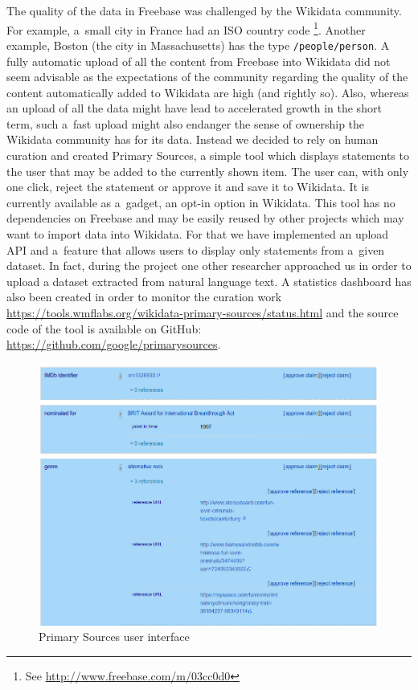 \documentclass{sig-alternate}
\begin{document}
The quality of the data in Freebase was challenged by the Wikidata community.
For example, a~small city in France had an ISO country code%
\footnote{See \url{http://www.freebase.com/m/03cc0d0}}.
Another example, Boston (the city in Massachusetts) has the type \texttt{/people/person}.
A fully automatic upload of all the content from Freebase into Wikidata
did not seem advisable as the expectations of the community regarding
the quality of the content automatically added to Wikidata are high (and rightly so).
Also, whereas an upload of all the data might have lead to accelerated growth
in the short term, such a~fast upload might also endanger the sense of ownership
the Wikidata community has for its data.
Instead we decided to rely on human curation and created Primary Sources,
a simple tool which displays statements to the user that may be added to the currently shown item.
The user can, with only one click, reject the statement or approve it and save it to Wikidata.
It is currently available as a~gadget, an opt-in option in Wikidata.
This tool has no dependencies on Freebase and may be easily reused by other projects
which may want to import data into Wikidata.
For that we have implemented an upload API and a~feature that allows users
to display only statements from a~given dataset.
In fact, during the project one other researcher approached us in order to upload
a dataset extracted from natural language text.
A statistics dashboard has also been created in order to monitor the curation work
\url{https://tools.wmflabs.org/wikidata-primary-sources/status.html}
and the source code of the tool is available on GitHub:
\url{https://github.com/google/primarysources}.

\begin{figure}
\centering
\includegraphics[width=8.45 cm]{img/primary-sources.png}
\caption{Primary Sources user interface}
\end{figure}
\end{document}
